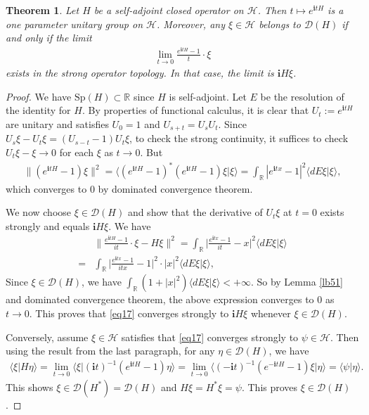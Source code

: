 \documentclass[12pt,b5paper,notitlepage]{article}
\theoremstyle{definition}
\theoremstyle{plain}
\newtheorem{thm}[df]{Theorem}
\newcommand{\mc}{\mathcal}
\newcommand{\Dom}{\scr D}
\newcommand{\bk}[1]{\langle {#1}\rangle}
\newcommand{\scr}{\mathscr}
\newcommand{\im}{\mathbf{i}}
\newcommand{\Rbb}{\mathbb R}
\newcommand{\Sp}{\mathrm{Sp}}
\numberwithin{equation}{section}
\begin{document}
\begin{thm}
Let $H$ be a self-adjoint closed operator on $\mc H$. Then $t\mapsto e^{\im tH}$ is a one parameter unitary group on $\mc H$. Moreover, any $\xi\in\mc H$ belongs to $\Dom(H)$ if and only if the limit
\begin{align}
\lim_{t\rightarrow 0}\frac{e^{\im tH}-1}{t}\cdot \xi\label{eq17}	
\end{align}
exists in the strong operator topology. In that case, the limit is $\im H\xi$.
\end{thm}


\begin{proof}
We have $\Sp(H)\subset\Rbb$ since $H$ is self-adjoint. Let $E$ be the resolution of the identity for $H$. By properties of functional calculus, it is clear that $U_t:=e^{\im tH}$ are unitary and satisfies $U_0=1$ and $U_{s+t}=U_sU_t$. Since $U_s\xi-U_t\xi=(U_{s-t}-1)U_t\xi$, to check the strong continuity, it suffices to check $U_t\xi-\xi\rightarrow 0$ for each $\xi$ as $t\rightarrow 0$. But
\begin{align*}
\lVert (e^{\im tH}-1)\xi\lVert^2=\bk{(e^{\im tH}-1)^*(e^{\im tH}-1)\xi|\xi}=\int_\Rbb |e^{\im tx}-1|^2\bk{dE\xi|\xi},
\end{align*}
which converges to $0$ by dominated convergence theorem.

We now choose $\xi\in\Dom(H)$ and show that the derivative of $U_t\xi$ at $t=0$ exists strongly and equals $\im H\xi$. We have
\begin{align}
&\Big\lVert \frac{e^{\im tH}-1}{it}\cdot \xi-H\xi  \Big\lVert^2=\int_\Rbb \Big|\frac{e^{\im tx}-1}{it}-x  \Big|^2\bk{dE\xi|\xi}\nonumber\\
=&	\int_\Rbb \Big|\frac{e^{\im tx}-1}{itx}-1  \Big|^2\cdot |x|^2\bk{dE\xi|\xi},\nonumber
\end{align}
Since $\xi\in\Dom(H)$, we have $\int_\Rbb (1+|x|^2)\bk{dE\xi|\xi}<+\infty$. So by Lemma \ref{lb51} and dominated convergence theorem, the above expression converges to $0$ as $t\rightarrow 0$. This proves that \eqref{eq17} converges strongly to $\im H\xi$ whenever $\xi\in\Dom(H)$.

Conversely, assume $\xi\in\mc H$ satisfies that \eqref{eq17} converges strongly to $\psi\in\mc H$. Then using the result from the last paragraph, for any $\eta\in\Dom(H)$, we have
\begin{align}
\bk{\xi|H\eta}=\lim_{t\rightarrow 0}\bk{\xi|(\im t)^{-1}(e^{\im tH}-1)\eta}=\lim_{t\rightarrow 0}\bk{(-\im t)^{-1}(e^{-\im tH}-1)\xi|\eta}=\bk{\psi|\eta}.	\label{eq18}
\end{align}
This shows $\xi\in\Dom(H^*)=\Dom(H)$ and $H\xi=H^*\xi=\psi$. This proves $\xi\in\Dom(H)$.
\end{proof}
\end{document}
